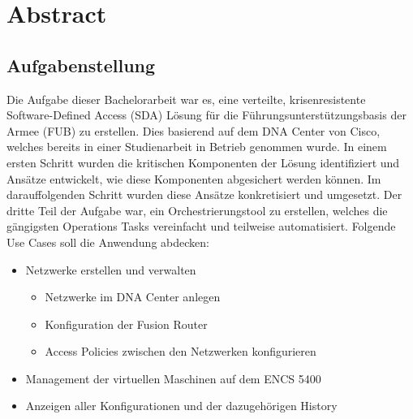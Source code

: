 \section{Abstract} 

\subsection{Aufgabenstellung} 
Die Aufgabe dieser Bachelorarbeit war es, eine verteilte, krisenresistente Software-Defined Access (SDA) Lösung für die Führungsunterstützungsbasis der Armee (FUB) zu erstellen. Dies basierend auf dem DNA Center von Cisco, welches bereits in einer Studienarbeit in Betrieb genommen wurde. In einem ersten Schritt wurden die kritischen Komponenten der Lösung identifiziert und Ansätze entwickelt, wie diese Komponenten abgesichert werden können. Im darauffolgenden Schritt wurden diese Ansätze konkretisiert und umgesetzt. Der dritte Teil der Aufgabe war, ein Orchestrierungstool zu erstellen, welches die gängigsten Operations Tasks vereinfacht und teilweise automatisiert. Folgende Use Cases soll die Anwendung abdecken:
\begin{itemize}
	\item Netzwerke erstellen und verwalten
	\begin{itemize}
		\item Netzwerke im DNA Center anlegen
		\item Konfiguration der Fusion Router
		\item Access Policies zwischen den Netzwerken konfigurieren
	\end{itemize}
	\item Management der virtuellen Maschinen auf dem ENCS 5400
	\item Anzeigen aller Konfigurationen und der dazugehörigen History
\end{itemize}


